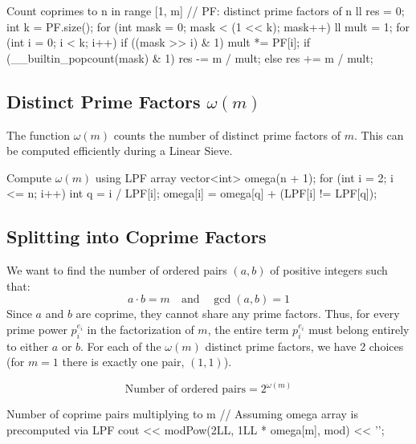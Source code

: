 \documentclass[11pt]{article}
\begin{document}
\begin{vscode}{Count coprimes to n in range [1, m]}
// PF: distinct prime factors of n
ll res = 0;
int k = PF.size();
for (int mask = 0; mask < (1 << k); mask++)
{
    ll mult = 1;
    for (int i = 0; i < k; i++)
        if ((mask >> i) & 1)
            mult *= PF[i];
    if (__builtin_popcount(mask) & 1)
        res -= m / mult;
    else
        res += m / mult;
}
\end{vscode}

\subsection{Distinct Prime Factors \texorpdfstring{$\omega(m)$}{omega(m)}}
The function $\omega(m)$ counts the number of distinct prime factors of $m$. This can be computed efficiently during a Linear Sieve.

\begin{vscode}{Compute $\omega(m)$ using LPF array}
vector<int> omega(n + 1);
for (int i = 2; i <= n; i++)
{
    int q = i / LPF[i];
    omega[i] = omega[q] + (LPF[i] != LPF[q]);
}
\end{vscode}
\pagebreak
\subsection{Splitting into Coprime Factors}
We want to find the number of ordered pairs $(a, b)$ of positive integers such that:
\[ a \cdot b = m \quad \text{and} \quad \gcd(a, b) = 1 \]
Since $a$ and $b$ are coprime, they cannot share any prime factors. Thus, for every prime power $p_i^{e_i}$ in the factorization of $m$, the entire term $p_i^{e_i}$ must belong entirely to either $a$ or $b$.
For each of the $\omega(m)$ distinct prime factors, we have 2 choices (for $m=1$ there is exactly one pair, $(1,1)$).

\begin{resultbox}
    \begin{equation}
        \text{Number of ordered pairs} = 2^{\omega(m)}
    \end{equation}
\end{resultbox}

\begin{vscode}{Number of coprime pairs multiplying to m}
// Assuming omega array is precomputed via LPF
cout << modPow(2LL, 1LL * omega[m], mod) << '\n';
\end{vscode}
\end{document}
